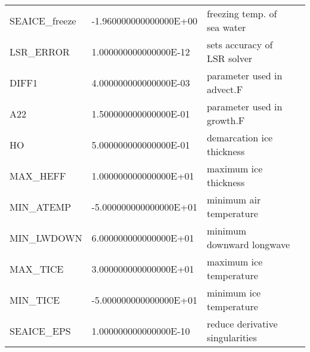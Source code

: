 \begin{table}
\begin{tabular}{lllc}
   SEAICE\_freeze       &                  -1.960000000000000E+00
    &   freezing temp. of sea water 
    &  %
    \\
   LSR\_ERROR           &                   1.000000000000000E-12
    &   sets accuracy of LSR solver 
    &  %
    \\
   DIFF1               &                   4.000000000000000E-03
    &   parameter used in advect.F 
    &  %
    \\
   A22                 &                   1.500000000000000E-01
    &   parameter used in growth.F 
    &  %
    \\
   HO                  &                   5.000000000000000E-01
    &   demarcation ice thickness 
    &  %
    \\
   MAX\_HEFF            &                   1.000000000000000E+01
    &   maximum ice thickness 
    &  %
    \\
   MIN\_ATEMP           &                  -5.000000000000000E+01
    &   minimum air temperature 
    &  %
    \\
   MIN\_LWDOWN          &                   6.000000000000000E+01
    &   minimum downward longwave 
    &  %
    \\
   MAX\_TICE            &                   3.000000000000000E+01
    &   maximum ice temperature 
    &  %
    \\
   MIN\_TICE            &                  -5.000000000000000E+01
    &   minimum ice temperature 
    &  %
    \\
   SEAICE\_EPS          &                   1.000000000000000E-10
    &   reduce derivative singularities 
    &  %
    \\

\end{tabular}
\end{table}

